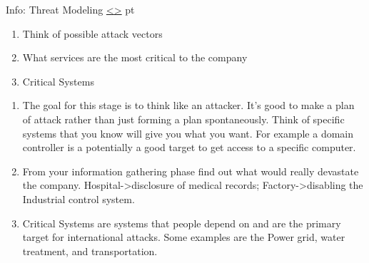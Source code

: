 \documentclass[12pt]{extarticle}
\newenvironment{instructionblock}{\Large\bgroup}{\egroup}
\newcounter{next}
\newcounter{prev}
\begin{document}
\pagebreak
{}
\begin{slide}{Info: Threat Modeling}
{\hyperref[slide \theprev]{\textless}\hyperref[slide \thenext]{\textgreater}}
	 pt
	\begin{instructionblock}
		\begin{enumerate}
            \item Think of possible attack vectors
            \item What services are the most critical to the company
            \item Critical Systems
		\end{enumerate}
	\end{instructionblock}
\end{slide}
\label{Q2}
\begin{enumerate}
\item The goal for this stage is to think like an attacker. It's good to make a plan of attack rather than just forming a plan spontaneously. Think of specific systems that you know will give you what you want. For example a domain controller is a potentially a good target to get access to a specific computer. \cite[Chapter 0]{Ref:Weidman}
\item From your information gathering phase find out what would really devastate the company. Hospital->disclosure of medical records; Factory->disabling the Industrial control system. \cite[Chapter 0]{Ref:Weidman}
\item Critical Systems are systems that people depend on and are the primary target for international attacks. Some examples are the Power grid, water treatment, and transportation. \cite{Ref:CriticalSystems}
\end{enumerate}
\end{document}
